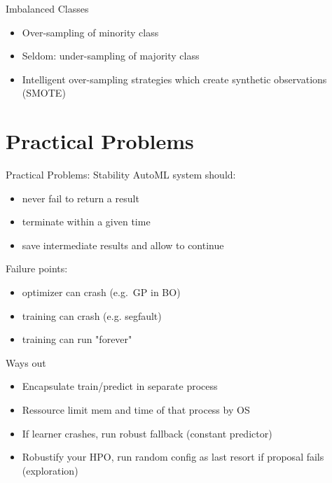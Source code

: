 \begin{frame}{Imbalanced Classes}
  \begin{itemize}
    \item Over-sampling of minority class
    \item Seldom: under-sampling of majority class
    \item Intelligent over-sampling strategies which create
        synthetic observations (SMOTE) 
  \end{itemize}
\end{frame}

\section{Practical Problems}

\begin{frame}{Practical Problems: Stability}
  AutoML system should: 
  \begin{itemize}
    \item never fail to return a result
    \item terminate within a given time
    \item save intermediate results and allow to continue
  \end{itemize}

  Failure points:
  \begin{itemize}
    \item optimizer can crash (e.g.\ GP in BO) 
    \item training can crash (e.g. segfault) 
    \item training can run "forever" 
  \end{itemize}

  Ways out
  \begin{itemize}
    \item Encapsulate train/predict in separate process
    \item Ressource limit mem and time of that process by OS
    \item If learner crashes, run robust fallback (constant predictor)   
    \item Robustify your HPO, run random config as last resort if proposal fails (exploration)
  \end{itemize}

\end{frame}

